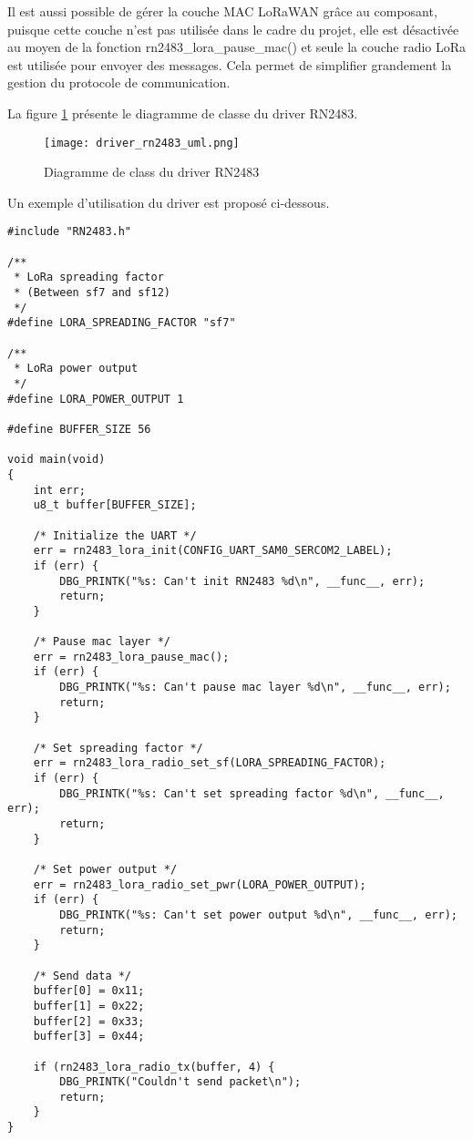 Il est aussi possible de gérer la couche MAC LoRaWAN grâce au composant, puisque cette couche n'est pas utilisée dans le cadre du projet, elle est désactivée au moyen de la fonction rn2483\_lora\_pause\_mac() et seule la couche radio LoRa est utilisée pour envoyer des messages. Cela permet de simplifier grandement la gestion du protocole de communication.

La figure \ref{fig:driver_rn2483_uml} présente le diagramme de classe du driver RN2483.

\begin{figure}[htb]
\centering 
\texttt{[image: driver\_rn2483\_uml.png]} 
\caption{Diagramme de class du driver RN2483}
\label{fig:driver_rn2483_uml}
\end{figure}

Un exemple d'utilisation du driver est proposé ci-dessous.

\begin{lstlisting}[style=CStyle]
#include "RN2483.h"

/**
 * LoRa spreading factor
 * (Between sf7 and sf12)
 */
#define LORA_SPREADING_FACTOR "sf7"

/**
 * LoRa power output
 */
#define LORA_POWER_OUTPUT 1

#define BUFFER_SIZE 56

void main(void)
{
	int err;
	u8_t buffer[BUFFER_SIZE];

	/* Initialize the UART */
	err = rn2483_lora_init(CONFIG_UART_SAM0_SERCOM2_LABEL);
	if (err) {
		DBG_PRINTK("%s: Can't init RN2483 %d\n", __func__, err);
		return;
	}

	/* Pause mac layer */
	err = rn2483_lora_pause_mac();
	if (err) {
		DBG_PRINTK("%s: Can't pause mac layer %d\n", __func__, err);
		return;
	}

	/* Set spreading factor */
	err = rn2483_lora_radio_set_sf(LORA_SPREADING_FACTOR);
	if (err) {
		DBG_PRINTK("%s: Can't set spreading factor %d\n", __func__, err);
		return;
	}

	/* Set power output */
	err = rn2483_lora_radio_set_pwr(LORA_POWER_OUTPUT);
	if (err) {
		DBG_PRINTK("%s: Can't set power output %d\n", __func__, err);
		return;
	}
	
	/* Send data */
	buffer[0] = 0x11;
	buffer[1] = 0x22;
	buffer[2] = 0x33;
	buffer[3] = 0x44;
	
	if (rn2483_lora_radio_tx(buffer, 4) {
		DBG_PRINTK("Couldn't send packet\n");
		return;
	}	
}
\end{lstlisting}


